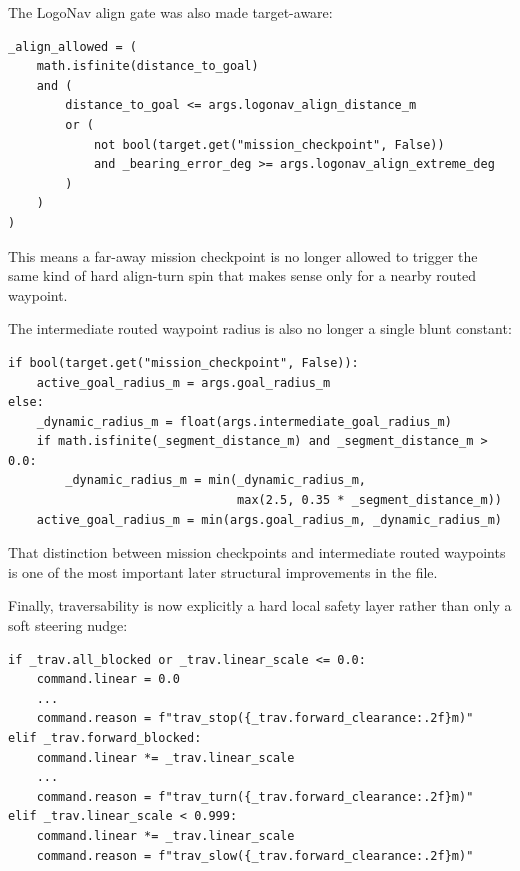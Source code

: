 \documentclass[11pt]{article}
\begin{document}
The LogoNav align gate was also made target-aware:
\begin{verbatim}
_align_allowed = (
    math.isfinite(distance_to_goal)
    and (
        distance_to_goal <= args.logonav_align_distance_m
        or (
            not bool(target.get("mission_checkpoint", False))
            and _bearing_error_deg >= args.logonav_align_extreme_deg
        )
    )
)
\end{verbatim}

This means a far-away mission checkpoint is no longer allowed to trigger the same kind of hard align-turn spin that makes sense only for a nearby routed waypoint.

The intermediate routed waypoint radius is also no longer a single blunt constant:
\begin{verbatim}
if bool(target.get("mission_checkpoint", False)):
    active_goal_radius_m = args.goal_radius_m
else:
    _dynamic_radius_m = float(args.intermediate_goal_radius_m)
    if math.isfinite(_segment_distance_m) and _segment_distance_m > 0.0:
        _dynamic_radius_m = min(_dynamic_radius_m,
                                max(2.5, 0.35 * _segment_distance_m))
    active_goal_radius_m = min(args.goal_radius_m, _dynamic_radius_m)
\end{verbatim}

That distinction between mission checkpoints and intermediate routed waypoints is one of the most important later structural improvements in the file.

Finally, traversability is now explicitly a hard local safety layer rather than only a soft steering nudge:
\begin{verbatim}
if _trav.all_blocked or _trav.linear_scale <= 0.0:
    command.linear = 0.0
    ...
    command.reason = f"trav_stop({_trav.forward_clearance:.2f}m)"
elif _trav.forward_blocked:
    command.linear *= _trav.linear_scale
    ...
    command.reason = f"trav_turn({_trav.forward_clearance:.2f}m)"
elif _trav.linear_scale < 0.999:
    command.linear *= _trav.linear_scale
    command.reason = f"trav_slow({_trav.forward_clearance:.2f}m)"
\end{verbatim}
\end{document}
